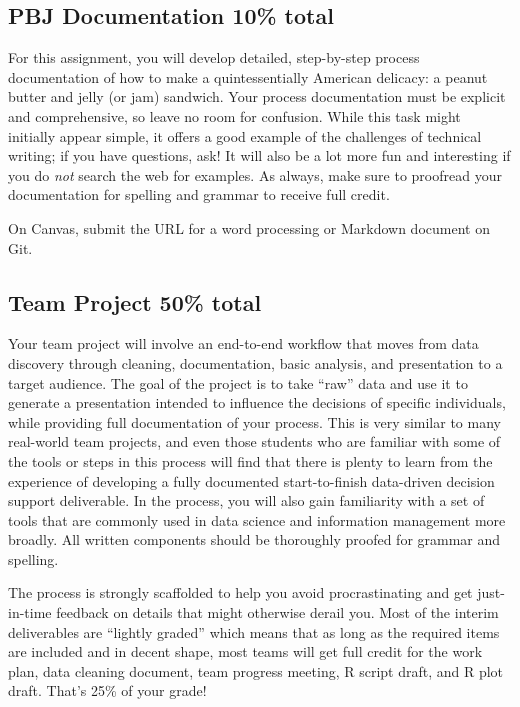 \documentclass[11pt]{article}
\begin{document}
\subsection{PBJ Documentation  10\% total}

For this assignment, you will develop detailed, step-by-step process documentation of how to make a quintessentially American delicacy: a peanut butter and jelly (or jam) sandwich.
Your process documentation must be explicit and comprehensive, so leave no room for confusion.
While this task might initially appear simple, it offers a good example of the challenges of technical writing; if you have questions, ask!
It will also be a lot more fun and interesting if you do \textit{not} search the web for examples.
As always, make sure to proofread your documentation for spelling and grammar to receive full credit.

On Canvas, submit the URL for a word processing or Markdown document on Git.

\subsection{Team Project  50\% total}

Your team project will involve an end-to-end workflow that moves from data discovery through cleaning, documentation, basic analysis, and presentation to a target audience.
The goal of the project is to take ``raw'' data and use it to generate a presentation intended to influence the decisions of specific individuals, while providing full documentation of your process.
This is very similar to many real-world team projects, and even those students who are familiar with some of the tools or steps in this process will find that there is plenty to learn from the experience of developing a fully documented start-to-finish data-driven decision support deliverable.
In the process, you will also gain familiarity with a set of tools that are  commonly used in data science and information management more broadly.
All written components should be thoroughly proofed for grammar and spelling.

The process is strongly scaffolded to help you avoid procrastinating and get just-in-time feedback on details that might otherwise derail you.
Most of the interim deliverables are ``lightly graded'' which means that as long as the required items are included and in decent shape, most teams will get full credit for the work plan, data cleaning document, team progress meeting, R script draft, and R plot draft.
That's 25\% of your grade!
\end{document}
